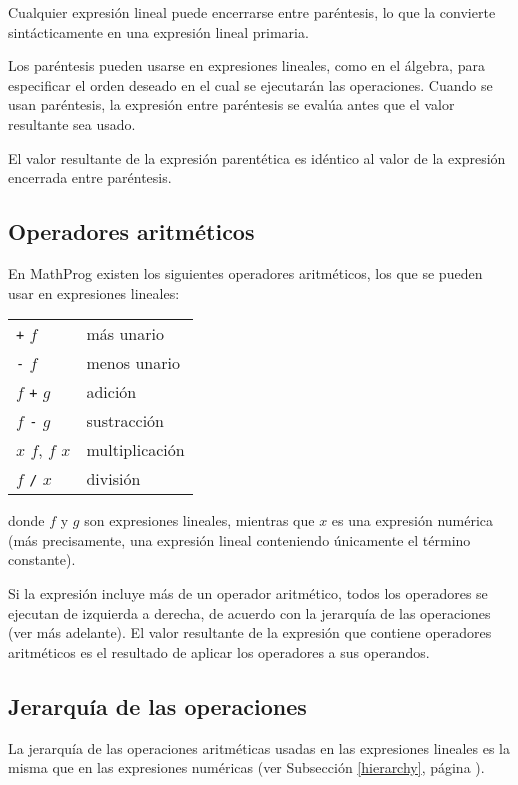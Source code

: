 \documentclass[11pt,spanish]{report}
\begin{document}
Cualquier expresión lineal puede encerrarse entre paréntesis, lo que la convierte sintácticamente en una expresión lineal primaria.

Los paréntesis pueden usarse en expresiones lineales, como en el álgebra, para especificar el orden deseado en el cual se ejecutarán las operaciones. Cuando se usan paréntesis, la expresión entre paréntesis se evalúa antes que el valor resultante sea usado.

El valor resultante de la expresión parentética es idéntico al valor de la expresión encerrada entre paréntesis.

\subsection{Operadores aritméticos}

En MathProg existen los siguientes operadores aritméticos, los que se pueden usar en expresiones lineales:

\begin{tabular}{@{}ll@{}}
{\tt+} $f$&más unario\\
{\tt-} $f$&menos unario\\
$f$ {\tt+} $g$&adición\\
$f$ {\tt-} $g$&sustracción\\
$x$ {\tt*} $f$, $f$ {\tt*} $x$&multiplicación\\
$f$ {\tt/} $x$&división
\end{tabular}

\noindent donde $f$ y $g$ son expresiones lineales, mientras que $x$ es una expresión numérica (más precisamente, una expresión lineal conteniendo únicamente el término constante).

Si la expresión incluye más de un operador aritmético, todos los operadores se ejecutan de izquierda a derecha, de acuerdo con la jerarquía de las operaciones (ver más adelante). El valor resultante de la expresión que contiene operadores aritméticos es el resultado de aplicar los operadores a sus operandos.

\subsection{Jerarquía de las operaciones}

La jerarquía de las operaciones aritméticas usadas en las expresiones lineales es la misma que en las expresiones numéricas (ver Subsección \ref{hierarchy},
página \pageref{hierarchy}).

\end{document}

